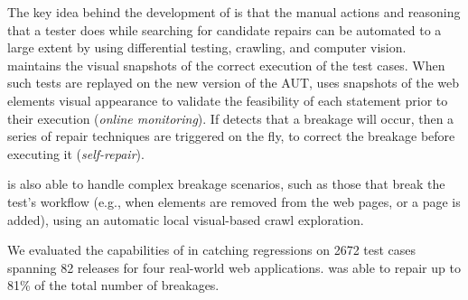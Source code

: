 

The key idea behind the development of \tool is that the manual actions and reasoning that a tester does while searching for candidate repairs can be automated to a large extent by using differential testing, crawling, and computer vision. 
\tool maintains the visual snapshots of the correct execution of the test cases. When such tests are replayed on the new version of the AUT, \tool uses snapshots of the web elements visual appearance to validate the feasibility of each statement prior to their execution (\textit{online monitoring}). If \tool detects that a breakage will occur, then a series of repair techniques are triggered on the fly, to correct the breakage before executing it (\textit{self-repair}).

\tool is also able to handle complex breakage scenarios, such as those that break the test's workflow (e.g., when elements are removed from the web pages, or a page is added), using an automatic local visual-based crawl exploration.

We evaluated the capabilities of \tool in catching regressions on 2672 test cases spanning 82 releases for four real-world web applications. \tool was able to repair up to 81\% of the total number of breakages. 

